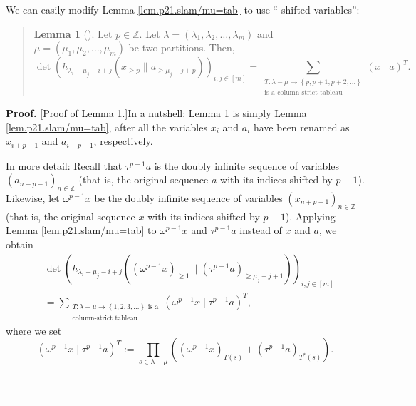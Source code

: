 \documentclass[numbers=enddot,12pt,final,onecolumn,notitlepage]{scrartcl}%
\newenvironment{statement}{\begin{quote}}{\end{quote}}
\theoremstyle{definition}
\newtheorem{lem}[theo]{Lemma}
\newenvironment{lemmain}[1][]
{\begin{statement}\begin{lem}[#1]}
{\end{lem}\end{statement}}
\newenvironment{proof}[1][Proof]{\noindent\textbf{#1.} }{\ \rule{0.5em}{0.5em}}
\newenvironment{lemmain}[1][Proof]{\noindent\textbf{#1.} }{\ \rule{0.5em}{0.5em}}
\let\sumnonlimits\sum
\let\prodnonlimits\prod
\renewcommand{\sum}{\sumnonlimits\limits}
\renewcommand{\prod}{\prodnonlimits\limits}
\begin{document}
\begin{enumerate}
We can easily modify Lemma \ref{lem.p21.slam/mu=tab} to use \textquotedblleft
shifted variables\textquotedblright:

\begin{lemmain}
\label{lem.p21.slam/mu=tab.shift}Let $p\in\mathbb{Z}$. Let $\lambda=\left(
\lambda_{1},\lambda_{2},\ldots,\lambda_{m}\right)  $ and $\mu=\left(  \mu
_{1},\mu_{2},\ldots,\mu_{m}\right)  $ be two partitions. Then,%
\[
\det\left(  h_{\lambda_{i}-\mu_{j}-i+j}\left(  x_{\geq p}\parallel a_{\geq
\mu_{j}-j+p}\right)  \right)  _{i,j\in\left[  m\right]  }=\sum
_{\substack{T:\lambda-\mu\rightarrow\left\{  p,p+1,p+2,\ldots\right\}
\\\text{is a column-strict tableau}}}\left(  x\mid a\right)  ^{T}.
\]

\end{lemmain}

\begin{proof}
[Proof of Lemma \ref{lem.p21.slam/mu=tab.shift}.]In a nutshell: Lemma
\ref{lem.p21.slam/mu=tab.shift} is simply Lemma \ref{lem.p21.slam/mu=tab},
after all the variables $x_{i}$ and $a_{i}$ have been renamed as $x_{i+p-1}$
and $a_{i+p-1}$, respectively.

In more detail: Recall that $\tau^{p-1}a$ is the doubly infinite sequence of
variables $\left(  a_{n+p-1}\right)  _{n\in\mathbb{Z}}$ (that is, the original
sequence $a$ with its indices shifted by $p-1$). Likewise, let $\omega^{p-1}x$
be the doubly infinite sequence of variables $\left(  x_{n+p-1}\right)
_{n\in\mathbb{Z}}$ (that is, the original sequence $x$ with its indices
shifted by $p-1$). Applying Lemma \ref{lem.p21.slam/mu=tab} to $\omega^{p-1}x$
and $\tau^{p-1}a$ instead of $x$ and $a$, we obtain%
\begin{align}
&  \det\left(  h_{\lambda_{i}-\mu_{j}-i+j}\left(  \left(  \omega
^{p-1}x\right)  _{\geq1}\parallel\left(  \tau^{p-1}a\right)  _{\geq\mu
_{j}-j+1}\right)  \right)  _{i,j\in\left[  m\right]  }\nonumber\\
&  =\sum_{\substack{T:\lambda-\mu\rightarrow\left\{  1,2,3,\ldots\right\}
\text{ is a}\\\text{column-strict tableau}}}\left(  \omega^{p-1}x\mid
\tau^{p-1}a\right)  ^{T}, \label{pf.lem.p21.slam/mu=tab.shift.1}%
\end{align}
where we set%
\[
\left(  \omega^{p-1}x\mid\tau^{p-1}a\right)  ^{T}:=\prod_{s\in\lambda-\mu
}\left(  \left(  \omega^{p-1}x\right)  _{T\left(  s\right)  }+\left(
\tau^{p-1}a\right)  _{T^{\ast}\left(  s\right)  }\right)  .
\]



\end{proof}
\end{enumerate}
\end{document}
